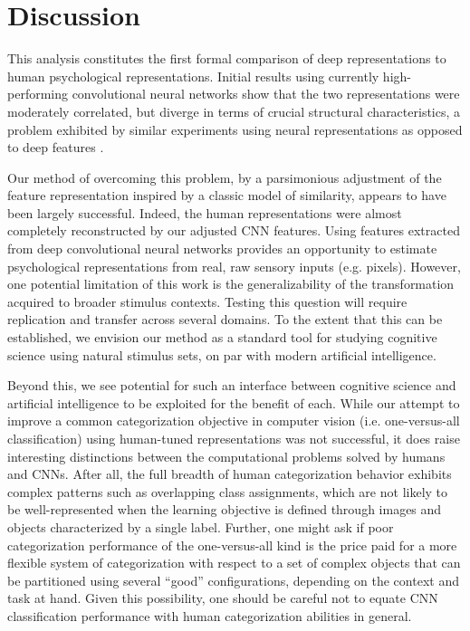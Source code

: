 \documentclass[10pt,letterpaper]{article}
\begin{document}
\section{Discussion}
This analysis constitutes the first formal comparison of deep representations to human psychological representations. Initial results using currently high-performing convolutional neural networks show that the two representations were moderately correlated, but diverge in terms of crucial structural characteristics, a problem exhibited by similar experiments using neural representations as opposed to deep features \citep*{mur_human_2013}.

Our method of overcoming this problem, by a parsimonious adjustment of the feature representation inspired by a classic model of similarity, appears to have been largely successful. Indeed, the human representations were almost completely reconstructed by our adjusted CNN features. Using features extracted from deep convolutional neural networks provides an opportunity to estimate psychological representations from real, raw sensory inputs (e.g. pixels). However, one potential limitation of this work is the generalizability of the transformation acquired to broader stimulus contexts. Testing this question will require replication and transfer across several domains. To the extent that this can be established, we envision our method as a standard tool for studying cognitive science using natural stimulus sets, on par with modern artificial intelligence.

Beyond this, we see potential for such an interface between cognitive science and artificial intelligence to be exploited for the benefit of each. While our attempt to improve a common categorization objective in computer vision (i.e. one-versus-all classification) using human-tuned representations was not successful, it does raise interesting distinctions between the computational problems solved by humans and CNNs. After all, the full breadth of human categorization behavior exhibits complex patterns such as overlapping class assignments, which are not likely to be well-represented when the learning objective is defined through images and objects characterized by a single label. Further, one might ask if poor categorization performance of the one-versus-all kind is the price paid for a more flexible system of categorization with respect to a set of complex objects that can be partitioned using several ``good'' configurations, depending on the context and task at hand. Given this possibility, one should be careful not to equate CNN classification performance with human categorization abilities in general.
%
\nocite{afkham2008joint}
\nocite{agrawal_pixels_2014}
\nocite{austerweil_nonparametric_2013}
\nocite{he2015delving}
\nocite{jia2014caffe}
\nocite{khaligh-razavi_deep_2014}
\nocite{krizhevsky2012imagenet}
\nocite{lake_deep_2015}
\nocite{lecun1989backpropagation}
\nocite{mur_human_2013}
\nocite{ICCV15_ObjectMemorability}
\nocite{sainath2013learning}
\nocite{shepard1979additive}
\nocite{simonyan2014very}
\nocite{szegedy2013intriguing}
\nocite{szegedy2014going}
\nocite{yamins2014performance}
\nocite{bengio2009learning}
\nocite{lecun2015deep}
\end{document}
